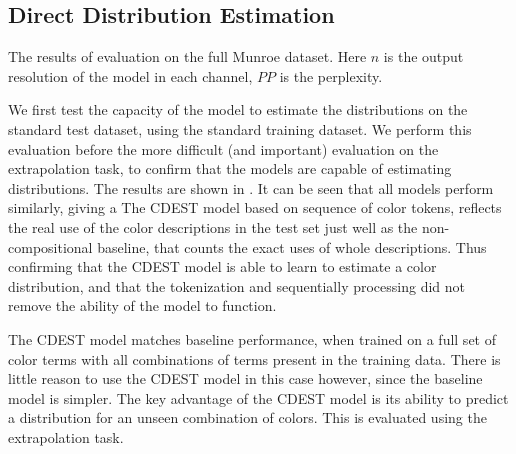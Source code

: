 \documentclass[11pt,a4paper]{article}
\begin{document}
\subsection{Direct Distribution Estimation}

\begin{table}
	\centering
	\caption{\label{tblresfull} The results of evaluation on the full Munroe  dataset. Here $n$ is the output resolution of the model in each channel, $PP$ is the perplexity.}
\end{table}

We first test the capacity of the model to estimate the distributions on the standard test dataset, using the standard training dataset.
We perform this evaluation before the more difficult (and important) evaluation on the extrapolation task, to confirm that the models are capable of estimating distributions.
The results are shown in .
It can be seen that all models perform similarly, giving a 
The CDEST model based on sequence of color tokens, reflects the real use of the color descriptions in the test set 
just well as the non-compositional baseline, that counts the exact uses of whole descriptions.
Thus confirming that the CDEST model is able to learn to estimate a color distribution, and that the tokenization and sequentially processing did not remove the ability of the model to function.

The CDEST model matches baseline performance, when trained on a full set of color terms with all combinations of terms present in the training data.
There is little reason to use the CDEST model in this case however, since the baseline model is simpler.
The key advantage of the CDEST model is its ability to predict a distribution for an unseen combination of colors. This is evaluated using the extrapolation task.
\end{document}
